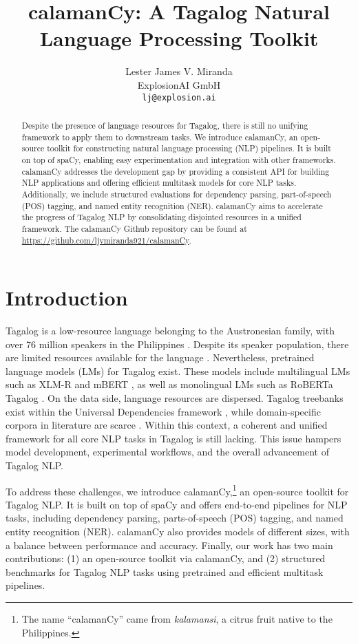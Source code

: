 \documentclass[11pt]{article}
\title{calamanCy: A Tagalog Natural Language Processing Toolkit}
\author{Lester James V. Miranda \\
  ExplosionAI GmbH \\
  \texttt{lj@explosion.ai}}
\begin{document}
\maketitle
\begin{abstract}
  Despite the presence of language resources for Tagalog, there is still no unifying framework to apply them to downstream tasks.
  We introduce calamanCy, an open-source toolkit for constructing natural language processing (NLP) pipelines.
  It is built on top of spaCy, enabling easy experimentation and integration with other frameworks.  
  calamanCy addresses the development gap by providing a consistent API for building NLP applications and offering efficient multitask models for core NLP tasks.
  Additionally, we include structured evaluations for dependency parsing, part-of-speech (POS) tagging, and named entity recognition (NER).
  calamanCy aims to accelerate the progress of Tagalog NLP by consolidating disjointed resources in a unified framework.
  The calamanCy Github repository can be found at \url{https://github.com/ljvmiranda921/calamanCy}.
\end{abstract}

\section{Introduction}

Tagalog is a low-resource language belonging to the Austronesian family, with over 76 million speakers in the Philippines \citep{Lewis2009EthnologueL}.
Despite its speaker population, there are limited resources available for the language \citep{Cruz2021ImprovingLL}. 
Nevertheless, pretrained language models (LMs) for Tagalog exist. 
These models include multilingual LMs such as XLM-R and mBERT \citep{Conneau2019UnsupervisedCR,Devlin2019BERTPO}, 
as well as monolingual LMs such as RoBERTa Tagalog \citep{Cruz2021ImprovingLL}. 
On the data side, language resources are dispersed.
Tagalog treebanks exist within the Universal Dependencies framework \citep{Dehouck2019PhylogenicMD,Kondratyuk201975L1,Aquino2020ParsingIT}, 
while domain-specific corpora in literature are scarce \citep{Enriquez2023DeterminingLF,Livelo2018IntelligentDI}. 
Within this context, a coherent and unified framework for all core NLP tasks in Tagalog is still lacking.
This issue hampers model development, experimental workflows, and the overall advancement of Tagalog NLP.

To address these challenges, we introduce calamanCy,\footnote[1]{
  The name ``calamanCy'' came from \textit{kalamansi}, a citrus fruit native to the Philippines.}
an open-source toolkit for Tagalog NLP. 
It is built on top of spaCy \citep{Honnibal2020Spacy} and offers end-to-end pipelines for NLP tasks, including dependency parsing, parts-of-speech (POS) tagging, and named entity recognition (NER). 
calamanCy also provides models of different sizes, with a balance between performance and accuracy.
Finally, our work has two main contributions: (1) an open-source toolkit via calamanCy, and (2) structured benchmarks for Tagalog NLP tasks using pretrained and efficient multitask pipelines.
\end{document}
